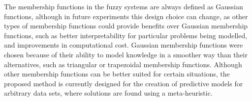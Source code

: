 ﻿\documentclass{ieeeaccess}
\begin{document}
The membership functions in the fuzzy systems are always defined as Gaussian
functions, although in future experiments this design choice can
change, as other types of membership functions could provide benefits
over Gaussian membership functions, such as better interpretability
for particular problems being modelled, and improvements in
computational cost. Gaussian membership functions were chosen because
of their ability to model knowledge in a smoother way than their alternatives, 
such as triangular or trapezoidal membership functions.
Although other membership functions can be better suited for certain situations, the proposed method is
currently designed for the creation of predictive models for arbitrary data sets,
where solutions are found using a meta-heuristic.


\end{document}
